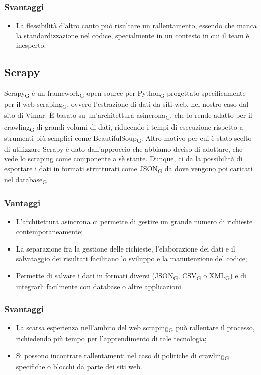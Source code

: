 \subsubsection{Svantaggi}
\begin{itemize}
    \item La flessibilità d'altro canto può risultare un rallentamento, essendo che manca la standardizzazione nel codice, specialmente in un contesto in cui il team è inesperto.
\end{itemize}

\subsection{Scrapy}
Scrapy\textsubscript{G} è un framework\textsubscript{G} open-source per Python\textsubscript{G} progettato specificamente per il web scraping\textsubscript{G}, ovvero l'estrazione di dati da siti web, nel nostro caso dal sito di Vimar. È basato su un'architettura asincrona\textsubscript{G}, che lo rende adatto per il crawling\textsubscript{G} di grandi volumi di dati, riducendo i tempi di esecuzione rispetto a strumenti più semplici come BeautifulSoup\textsubscript{G}. Altro motivo per cui è stato scelto di utilizzare Scrapy è dato dall'approccio che abbiamo deciso di adottare, che vede lo scraping come componente a sè stante. Dunque, ci da la possibilità di esportare i dati in formati strutturati come JSON\textsubscript{G} da dove vengono poi caricati nel database\textsubscript{G}.
\subsubsection{Vantaggi}
\begin{itemize}
    \item L'architettura asincrona ci permette di gestire un grande numero di richieste contemporaneamente;
    \item La separazione fra la gestione delle richieste, l'elaborazione dei dati e il salvataggio dei risultati facilitano lo sviluppo e la manutenzione del codice;
    \item Permette di salvare i dati in formati diversi (JSON\textsubscript{G}, CSV\textsubscript{G} o XML\textsubscript{G}) e di integrarli facilmente con database o altre applicazioni.
\end{itemize}
\subsubsection{Svantaggi}
\begin{itemize}
    \item La scarsa esperienza nell'ambito del web scraping\textsubscript{G} può rallentare il processo, richiedendo più tempo per l'apprendimento di tale tecnologia;
    \item Si possono incontrare rallentamenti nel caso di politiche di crawling\textsubscript{G} specifiche o blocchi da parte dei siti web.
\end{itemize}

